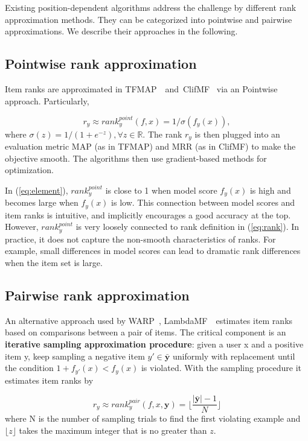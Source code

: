 \documentclass[letterpaper]{article} %
\begin{document}
Existing position-dependent algorithms address the challenge by different rank approximation methods. They can be categorized into pointwise and pairwise approximations. We describe their approaches in the following.

\subsection{Pointwise rank approximation}
Item ranks are approximated in TFMAP~\cite{shi2012tfmap}~and~ClifMF~\cite{shi2012climf} via an Pointwise approach. Particularly, 

\begin{equation}
\label{eq:element}
r_y \approx rank^{point}_y(f,x) = 1 / \sigma (f_y(x)),
\end{equation}
where $\sigma(z) = 1 / (1 + e^{-z}), \forall z\in \mathbb{R}$. The rank $r_y$ is then plugged into an evaluation metric MAP (as in TFMAP) and MRR (as in ClifMF) to make the objective smooth. The algorithms then use gradient-based methods for optimization.

In (\ref{eq:element}), $rank^{point}_y$ is close to 1 when model score $f_y(x)$ is high and becomes large when $f_y(x)$ is low. This connection between model scores and item ranks is intuitive, and implicitly encourages a good accuracy at the top. However, $rank^{point}_y$ is very loosely connected to rank definition in (\ref{eq:rank}). In practice, it does not capture the non-smooth characteristics of ranks. For example, small differences in model scores can lead to dramatic rank differences when the item set is large.

\subsection{Pairwise rank approximation}
An alternative approach used by WARP~\cite{weston2010large}, LambdaMF~\cite{yuan2016lambdafm}~estimates item ranks based on comparisons between a pair of items. The critical component is an \textbf{iterative sampling approximation procedure}: given a user x and a positive item y, keep sampling a negative item $y'\in\bar{\textbf{y}}$ uniformly with replacement until the condition $1+f_{y'}(x)<f_y(x)$ is violated. With the sampling procedure it estimates item ranks by

\begin{equation}
\label{eq:warp3}
r_y \approx rank^{pair}_y(f,x,\textbf{y}) = \lfloor \frac{|\bar{\textbf{y}}|-1}{N} \rfloor
\end{equation}
where N is the number of sampling trials to find the first violating example and $\lfloor z \rfloor$ takes the maximum integer that is no greater than $z$.
\end{document}
